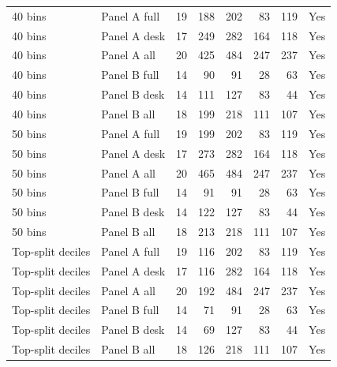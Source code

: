 \begin{tabular}{llrrrrrc}
40 bins & Panel A full & 19 & 188 & 202 & 83 & 119 & Yes \\
40 bins & Panel A desk & 17 & 249 & 282 & 164 & 118 & Yes \\
40 bins & Panel A all & 20 & 425 & 484 & 247 & 237 & Yes \\
40 bins & Panel B full & 14 & 90 & 91 & 28 & 63 & Yes \\
40 bins & Panel B desk & 14 & 111 & 127 & 83 & 44 & Yes \\
40 bins & Panel B all & 18 & 199 & 218 & 111 & 107 & Yes \\
50 bins & Panel A full & 19 & 199 & 202 & 83 & 119 & Yes \\
50 bins & Panel A desk & 17 & 273 & 282 & 164 & 118 & Yes \\
50 bins & Panel A all & 20 & 465 & 484 & 247 & 237 & Yes \\
50 bins & Panel B full & 14 & 91 & 91 & 28 & 63 & Yes \\
50 bins & Panel B desk & 14 & 122 & 127 & 83 & 44 & Yes \\
50 bins & Panel B all & 18 & 213 & 218 & 111 & 107 & Yes \\
Top-split deciles & Panel A full & 19 & 116 & 202 & 83 & 119 & Yes \\
Top-split deciles & Panel A desk & 17 & 116 & 282 & 164 & 118 & Yes \\
Top-split deciles & Panel A all & 20 & 192 & 484 & 247 & 237 & Yes \\
Top-split deciles & Panel B full & 14 & 71 & 91 & 28 & 63 & Yes \\
Top-split deciles & Panel B desk & 14 & 69 & 127 & 83 & 44 & Yes \\
Top-split deciles & Panel B all & 18 & 126 & 218 & 111 & 107 & Yes \\
\bottomrule
\end{tabular}
